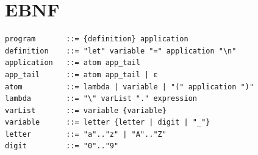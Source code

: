 \documentclass{article}
\begin{document}
\section{EBNF}

\begin{verbatim}
program       ::= {definition} application
definition    ::= "let" variable "=" application "\n"
application   ::= atom app_tail
app_tail      ::= atom app_tail | ε  
atom          ::= lambda | variable | "(" application ")" 
lambda        ::= "\" varList "." expression
varList       ::= variable {variable}
variable      ::= letter {letter | digit | "_"}
letter        ::= "a".."z" | "A".."Z"
digit         ::= "0".."9"
\end{verbatim}
\end{document}
